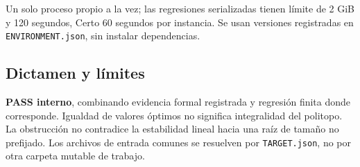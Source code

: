 \documentclass[11pt]{article}
\begin{document}
Un solo proceso propio a la vez; las regresiones serializadas tienen
límite de 2 GiB y 120 segundos, Certo 60 segundos por instancia. Se usan
versiones registradas en \nolinkurl{ENVIRONMENT.json}, sin instalar
dependencias.

\subsection{Dictamen y límites}\label{dictamen-y-luxedmites}

\textbf{PASS interno}, combinando evidencia formal registrada y
regresión finita donde corresponde. Igualdad de valores óptimos no
significa integralidad del politopo. La obstrucción no contradice la
estabilidad lineal hacia una raíz de tamaño no prefijado. Los archivos
de entrada comunes se resuelven por \nolinkurl{TARGET.json}, no por otra
carpeta mutable de trabajo.
\end{document}
